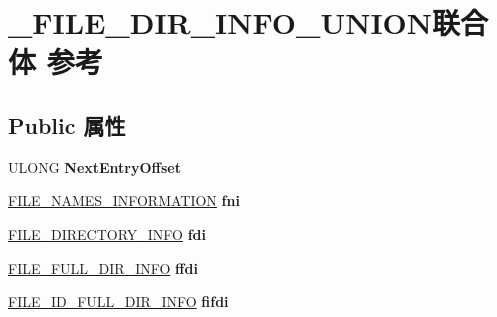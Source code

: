 \hypertarget{union___f_i_l_e___d_i_r___i_n_f_o___u_n_i_o_n}{}\section{\+\_\+\+F\+I\+L\+E\+\_\+\+D\+I\+R\+\_\+\+I\+N\+F\+O\+\_\+\+U\+N\+I\+O\+N联合体 参考}
\label{union___f_i_l_e___d_i_r___i_n_f_o___u_n_i_o_n}
\subsection*{Public 属性}
\begin{DoxyCompactItemize}
\item 
\mbox{\label{union___f_i_l_e___d_i_r___i_n_f_o___u_n_i_o_n_a47731c9b62b0640d6b3ac871af379e4f}} 
U\+L\+O\+NG {\bfseries Next\+Entry\+Offset}
\item 
\mbox{\label{union___f_i_l_e___d_i_r___i_n_f_o___u_n_i_o_n_ac938c13a369cda1af8a72ce00104d0ed}} 
\hyperlink{struct___f_i_l_e___n_a_m_e_s___i_n_f_o_r_m_a_t_i_o_n}{F\+I\+L\+E\+\_\+\+N\+A\+M\+E\+S\+\_\+\+I\+N\+F\+O\+R\+M\+A\+T\+I\+ON} {\bfseries fni}
\item 
\mbox{\label{union___f_i_l_e___d_i_r___i_n_f_o___u_n_i_o_n_aa10b1962bddeffb666f158899a58dd5b}} 
\hyperlink{struct___f_i_l_e___d_i_r_e_c_t_o_r_y___i_n_f_o}{F\+I\+L\+E\+\_\+\+D\+I\+R\+E\+C\+T\+O\+R\+Y\+\_\+\+I\+N\+FO} {\bfseries fdi}
\item 
\mbox{\label{union___f_i_l_e___d_i_r___i_n_f_o___u_n_i_o_n_a5bbc25a26e5d4049558a371c36dc1d69}} 
\hyperlink{struct___f_i_l_e___f_u_l_l___d_i_r___i_n_f_o}{F\+I\+L\+E\+\_\+\+F\+U\+L\+L\+\_\+\+D\+I\+R\+\_\+\+I\+N\+FO} {\bfseries ffdi}
\item 
\mbox{\label{union___f_i_l_e___d_i_r___i_n_f_o___u_n_i_o_n_a7f63810e3f495c5a614302c6e9d76b69}} 
\hyperlink{struct___f_i_l_e___i_d___f_u_l_l___d_i_r___i_n_f_o}{F\+I\+L\+E\+\_\+\+I\+D\+\_\+\+F\+U\+L\+L\+\_\+\+D\+I\+R\+\_\+\+I\+N\+FO} {\bfseries fifdi}
\item 

\end{DoxyCompactItemize}

